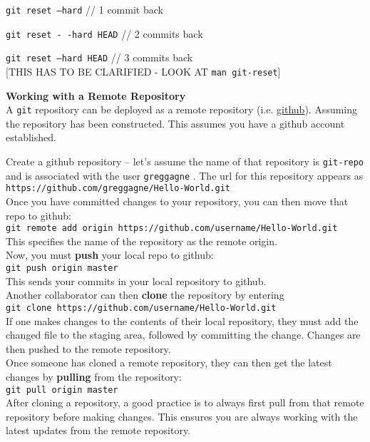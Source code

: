 \documentclass[12pt]{article}
\begin{document}
{\tt git reset --hard} // 1 commit back
 
{\tt git reset - -hard HEAD} // 2 commits back 

{\tt git reset  --hard HEAD} // 3 commits back \\
 
 [THIS HAS TO BE CLARIFIED - LOOK AT {\tt man git-reset}]

\noindent
{\bf Working with a Remote Repository} \\

\noindent
A {\tt git} repository can be deployed as a remote repository (i.e. \href{http://github.com}{github}). Assuming the repository has been constructed. This assumes you have a github account established.

\noindent
Create a github repository -- let's assume the name of that repository is {\tt git-repo} and is associated with the user {\tt greggagne} . The url for this repository appears as \\

{\tt https://github.com/greggagne/Hello-World.git} \\

\noindent
Once you have committed changes to your repository, you can then move that repo to github: \\

{\tt git remote add origin https://github.com/username/Hello-World.git} \\

\noindent
This specifies the name of the repository as the remote origin. \\

\noindent
Now, you must {\bf push} your local repo to github: \\

{\tt git push origin master} \\

\noindent
This sends your commits in your local repository to github. \\

\noindent
Another collaborator can then {\bf clone} the repository by entering \\

{\tt git clone https://github.com/username/Hello-World.git} \\

\noindent
If one makes changes to the contents of their local repository, they must add the changed file to the staging area, followed by committing the change. Changes are then pushed to the remote repository. \\

\noindent
Once someone has cloned a remote repository, they can then get the latest changes by {\bf pulling} from the repository: \\

{\tt git pull origin master} \\

\noindent
After cloning a repository, a good practice is to always first pull from that remote repository before making changes. This ensures you are always working with the latest updates from the remote repository. \\
\end{document}
